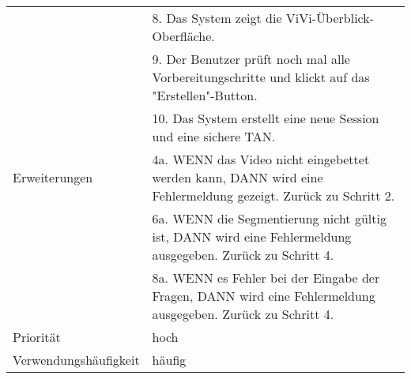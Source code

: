 \begin{tabularx}{\linewidth}{|l|X|}
							& 8. Das System zeigt die ViVi-Überblick-Oberfläche. \\ 
							& 9. Der Benutzer prüft noch mal alle Vorbereitungschritte und 
							  klickt auf das "Erstellen"-Button. \\
							& 10. Das System erstellt eine neue Session und eine sichere TAN. \\ 
							  \hline
	Erweiterungen			& 4a. WENN das Video nicht eingebettet werden kann, DANN wird eine 
	                          Fehlermeldung gezeigt. Zurück zu Schritt 2. \\
							& 6a. WENN die Segmentierung nicht gültig ist, DANN wird eine 
							  Fehlermeldung ausgegeben. Zurück zu Schritt 4.\\
							& 8a. WENN es Fehler bei der Eingabe der Fragen, DANN wird 
							  eine Fehlermeldung ausgegeben. Zurück zu Schritt 4. \\ \hline
	Priorität				& hoch \\ \hline
	Verwendungshäufigkeit	& häufig \\ \hline
\end{tabularx}